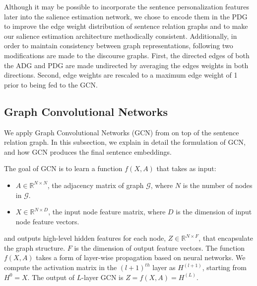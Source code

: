 \documentclass[11pt,a4paper]{article}
\begin{document}
Although it may be possible to incorporate the sentence personalization features later into the salience estimation network, 
we chose to encode them in the PDG to improve the edge weight distribution of sentence relation graphs and to make our salience estimation architecture methodically consistent. 
Additionally, in order to maintain
consistency between  graph  representations, following two modifications  are  made  to  the  discourse  graphs.
First, the directed edges of both the ADG and PDG are made undirected by averaging the edges weights in both directions. Second, edge weights are rescaled to a maximum edge weight of 1 prior to being fed to the GCN.



\subsection{Graph Convolutional Networks}
We apply Graph Convolutional Networks (GCN) from  on top of the sentence relation graph.
In this subsection, we explain in detail the formulation of GCN, and how GCN produces the final sentence embeddings.

The goal of GCN is to learn a function $f(X,A)$ that takes as input:
\begin{itemize}
\setlength{\leftskip}{-2mm}
\setlength{\parskip}{-1mm}
\item $A \in \mathbb{R}^{N \times N}$, the adjacency matrix of graph $\mathcal{G}$, where $N$ is the number of nodes in $\mathcal{G}$.
\item $X \in \mathbb{R}^{N \times D}$, the input node feature matrix, where $D$ is the dimension of input node feature vectors.
\end{itemize}
and outputs high-level hidden features for each node, $Z \in \mathbb{R}^{N \times F}$, that encapsulate the graph structure.
$F$ is the dimension of output feature vectors.
The function $f(X,A)$ takes a form of layer-wise propagation based on neural networks.
We compute the activation matrix in the $(l+1)^{th}$ layer as $H^{(l+1)}$, starting from $H^{0} = X$.
The output of $L$-layer GCN is $Z = f(X,A) = H^{(L)}$.
\end{document}
